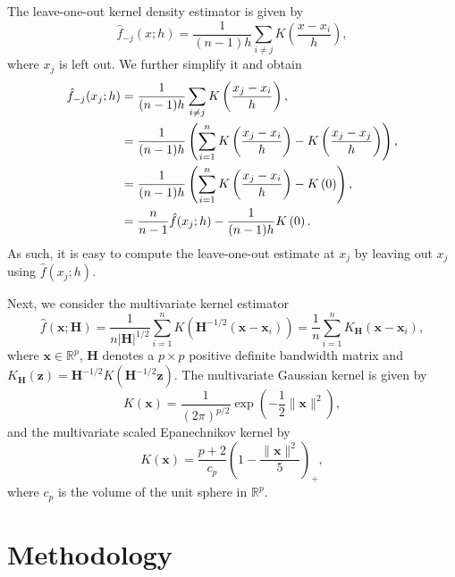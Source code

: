 \documentclass[11pt,a4paper,]{article}
\theoremstyle{definition}
\theoremstyle{definition}
\theoremstyle{definition}
\theoremstyle{remark}
\begin{document}
The leave-one-out kernel density estimator is given by
\begin{equation}\label{eq:kde9}
    \hat{f}_{-j}(x;h) = \frac{1}{(n-1)h}\sum_{i \neq j} K\left(\frac{x-x_i}{h}\right) ,
\end{equation}
where \(x_j\) is left out. We further simplify it and obtain
\begin{align}\label{eq:kde10}
    \hat{f}_{-j}(x_j;h) 
      & = \frac{1}{(n-1)h}\sum_{i \neq j} K\left(\frac{x_j-x_i}{h}\right) , \notag                                                  \\
      & = \frac{1}{(n-1)h} \left(\sum_{i = 1}^n K\left(\frac{x_j-x_i}{h}\right) - K\left(\frac{x_j-x_j}{h}\right) \right)  , \notag \\
      & = \frac{1}{(n-1)h} \left(\sum_{i = 1}^n K\left(\frac{x_j-x_i}{h}\right) - K\left(0\right) \right)  , \notag                 \\
      & = \frac{n}{n-1} \hat{f}(x_j;h) - \frac{1}{(n-1)h} K\left(0\right)  .
\end{align}
As such, it is easy to compute the leave-one-out estimate at \(x_j\) by leaving out \(x_j\) using \(\hat{f}(x_j;h)\).

Next, we consider the multivariate kernel estimator
\begin{equation}\label{eq:kde6}
    \hat{f}\left(\bm{x}; \bm{H}\right) = \frac{1}{n|\bm{H}|^{1/2}} \sum_{i=1}^n K\left(\bm{H}^{-1/2}(\bm{x} -\bm{x}_i) \right) = \frac{1}{n} \sum_{i=1}^n K_{\bm{H}}\left(\bm{x} -\bm{x}_i \right) ,
\end{equation}
where \(\mathbf{x} \in \mathbb{R}^p\), \(\bm{H}\) denotes a \(p \times p\) positive definite bandwidth matrix and \(K_{\bm{H}}(\bm{z}) = \bm{H}^{-1/2} K(\bm{H}^{-1/2} \bm{z})\). The multivariate Gaussian kernel is given by
\begin{equation}\label{eq:kde7}
    K(\bm{x}) = \frac{1}{(2\pi)^{p/2}} \exp\left( -\frac{1}{2} \| \bm{x} \| ^2\right) ,
\end{equation}
and the multivariate scaled Epanechnikov kernel by
\begin{equation}\label{eq:kde8}
    K(\bm{x}) = \frac{p+2}{c_p}\left(1 - \frac{\| \bm{x} \| ^2}{5} \right)_+  ,
\end{equation}
where \(c_p\) is the volume of the unit sphere in \(\mathbb{R}^p\).

\hypertarget{sec:lookout}{%
\section{Methodology}\label{sec:lookout}}
\end{document}
